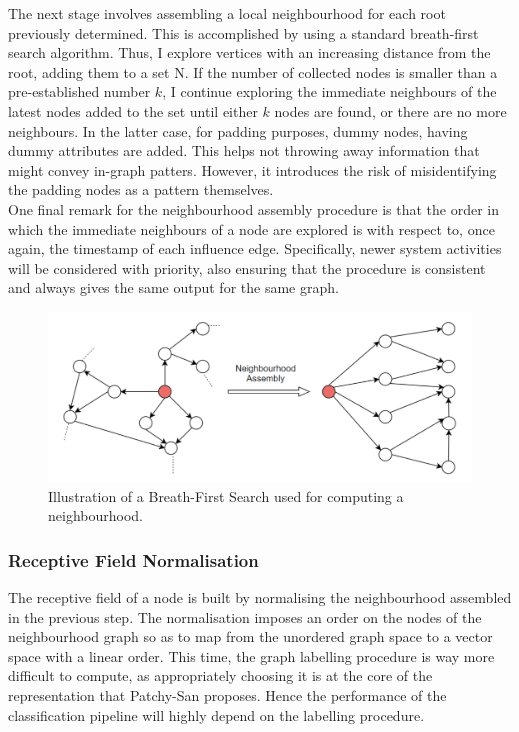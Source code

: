 The next stage involves assembling a local neighbourhood for each root previously determined. This is accomplished by using a standard breath-first search algorithm. Thus, I explore vertices with an increasing distance from the root, adding them to a set N. If the number of collected nodes is smaller than a pre-established number $k$, I continue exploring the immediate neighbours of the latest nodes added to the set until either $k$ nodes are found, or there are no more neighbours. In the latter case, for padding purposes, dummy nodes, having dummy attributes are added. This helps not throwing away information that might convey in-graph patters. However, it introduces the risk of misidentifying the padding nodes as a pattern themselves. \\

One final remark for the neighbourhood assembly procedure is that the order in which the immediate neighbours of a node are explored is with respect to, once again, the timestamp of each influence edge. Specifically, newer system activities will be considered with priority, also ensuring that the procedure is consistent and always gives the same output for the same graph. \\

\begin{figure}[H]
  \centering
  \includegraphics[scale=0.275]{Images/neighassemb2.png}
  \caption{Illustration of a Breath-First Search used for computing a neighbourhood.}
  \label{neighassemb}
\end{figure}


\subsubsection*{Receptive Field Normalisation}

The receptive field of a node is built by normalising the neighbourhood assembled in the previous step. The normalisation imposes an order on the nodes of the neighbourhood graph so as to map from the unordered graph space to a vector space with a linear order. This time, the graph labelling procedure is way more difficult to compute, as appropriately choosing it is at the core of the representation that Patchy-San proposes. Hence the performance of the classification pipeline will highly depend on the labelling procedure. \\

